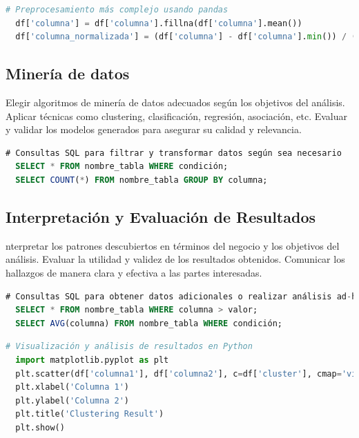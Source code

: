 \documentclass[12pt]{article}
\begin{document}
\begin{lstlisting}[language=Python]
  # Preprocesamiento más complejo usando pandas
  df['columna'] = df['columna'].fillna(df['columna'].mean())
  df['columna_normalizada'] = (df['columna'] - df['columna'].min()) / (df['columna'].max() - df['columna'].min())
\end{lstlisting}

\subsection{Minería de datos}

Elegir algoritmos de minería de datos adecuados según los objetivos del análisis. Aplicar técnicas como clustering, clasificación, regresión, asociación, etc. Evaluar y validar los modelos generados para asegurar su calidad y relevancia.

\begin{lstlisting}[language=SQL]
  # Consultas SQL para filtrar y transformar datos según sea necesario
  SELECT * FROM nombre_tabla WHERE condición;
  SELECT COUNT(*) FROM nombre_tabla GROUP BY columna;
\end{lstlisting}
\vspace{12pt}

\subsection{Interpretación y Evaluación de Resultados}

nterpretar los patrones descubiertos en términos del negocio y los objetivos del análisis. Evaluar la utilidad y validez de los resultados obtenidos. Comunicar los hallazgos de manera clara y efectiva a las partes interesadas. 

\begin{lstlisting}[language=SQL]
  # Consultas SQL para obtener datos adicionales o realizar análisis ad-hoc
  SELECT * FROM nombre_tabla WHERE columna > valor;
  SELECT AVG(columna) FROM nombre_tabla WHERE condición;
\end{lstlisting}
\vspace{12pt}

\begin{lstlisting}[language=Python]
  # Visualización y análisis de resultados en Python
  import matplotlib.pyplot as plt
  plt.scatter(df['columna1'], df['columna2'], c=df['cluster'], cmap='viridis')
  plt.xlabel('Columna 1')
  plt.ylabel('Columna 2')
  plt.title('Clustering Result')
  plt.show()
\end{lstlisting}
\end{document}
